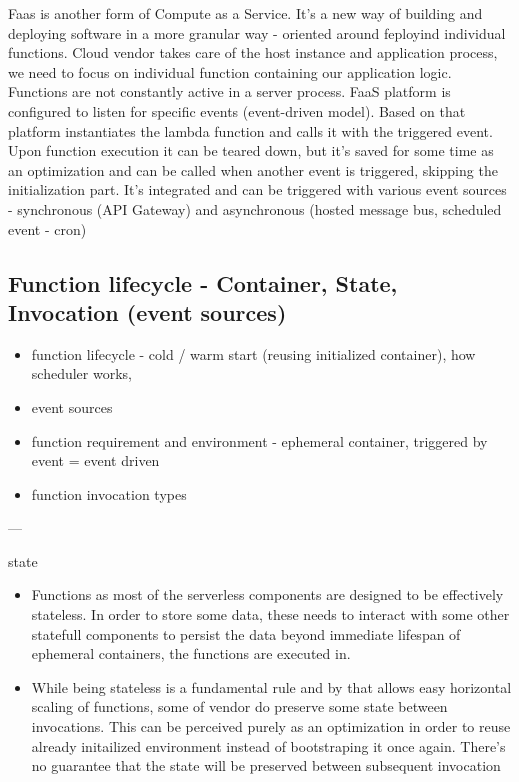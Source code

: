 Faas is another form of Compute as a Service. It's a new way of building and deploying software in a more granular way - oriented around feployind individual functions. Cloud vendor takes care of the host instance and application process, we need to focus on individual function containing our application logic. Functions are not constantly active in a server process. FaaS platform is configured to listen for specific events (event-driven model). Based on that platform instantiates the lambda function and calls it with the triggered event. Upon function execution it can be teared down, but it's saved for some time as an optimization and can be called when another event is triggered, skipping the initialization part. It's integrated and can be triggered with various event sources - synchronous (API Gateway) and asynchronous (hosted message bus, scheduled event - cron)


\subsection*{Function lifecycle - Container, State, Invocation (event sources)}

\begin{itemize}
    \item function lifecycle - cold / warm start (reusing initialized container), how scheduler works, 
    \item event sources
    \item function requirement and environment - ephemeral container, triggered by event = event driven
    \item function invocation types
\end{itemize}    

---

\noindent state

\begin{itemize}
    \item Functions as most of the serverless components are designed to be effectively stateless. In order to store some data, these needs to interact with some other statefull components to persist the data beyond immediate lifespan of ephemeral containers, the functions are executed in.
    \item While being stateless is a fundamental rule and by that allows easy horizontal scaling of functions, some of vendor do preserve some state between invocations. This can be perceived purely as an optimization in order to reuse already initailized environment instead of bootstraping it once again. There's no guarantee that the state will be preserved between subsequent invocation
\end{itemize}

